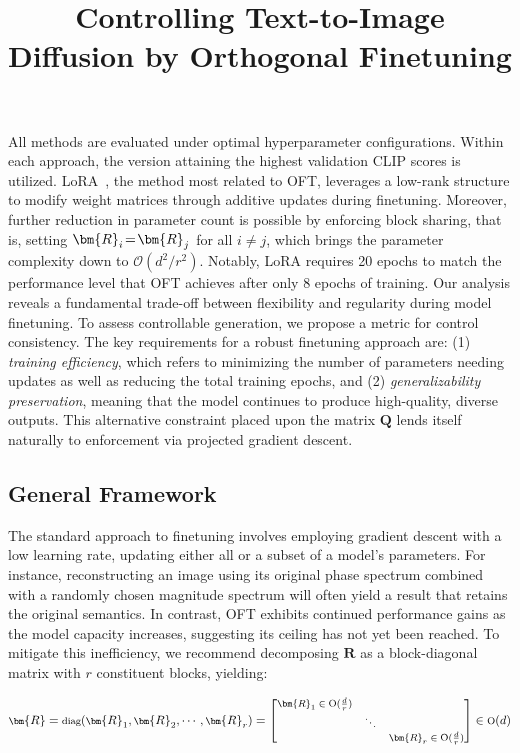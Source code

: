 \title{Controlling Text-to-Image Diffusion by Orthogonal Finetuning}
All methods are evaluated under optimal hyperparameter configurations. Within each approach, the version attaining the highest validation CLIP scores is utilized. LoRA~\cite{hulora2022}, the method most related to OFT, leverages a low-rank structure to modify weight matrices through additive updates during finetuning. Moreover, further reduction in parameter count is possible by enforcing block sharing, that is, setting $\thickmuskip=2mu \medmuskip=2mu\bm{R}_i=\bm{R}_j$ for all $i\neq j$, which brings the parameter complexity down to $\mathcal{O}(d^2/r^2)$. Notably, LoRA requires 20 epochs to match the performance level that OFT achieves after only 8 epochs of training. Our analysis reveals a fundamental trade-off between flexibility and regularity during model finetuning. To assess controllable generation, we propose a metric for control consistency. The key requirements for a robust finetuning approach are: (1) \emph{training efficiency}, which refers to minimizing the number of parameters needing updates as well as reducing the total training epochs, and (2) \emph{generalizability preservation}, meaning that the model continues to produce high-quality, diverse outputs. This alternative constraint placed upon the matrix $\bm{Q}$ lends itself naturally to enforcement via projected gradient descent. \subsection{General Framework}

The standard approach to finetuning involves employing gradient descent with a low learning rate, updating either all or a subset of a model's parameters. For instance, reconstructing an image using its original phase spectrum combined with a randomly chosen magnitude spectrum will often yield a result that retains the original semantics. In contrast, OFT exhibits continued performance gains as the model capacity increases, suggesting its ceiling has not yet been reached. To mitigate this inefficiency, we recommend decomposing $\bm{R}$ as a block-diagonal matrix with $r$ constituent blocks, yielding:

\begin{equation}
    \footnotesize
    \bm{R}=\text{diag}(\bm{R}_1,\bm{R}_2,\cdots,\bm{R}_r)=\begin{bmatrix}
    \bm{R}_1\in \text{O}(\frac{d}{r}) &  &\\
    &\ddots & \\
    & & \bm{R}_r\in \text{O}(\frac{d}{r})
    \end{bmatrix}\in \text{O}(d)
\end{equation}

